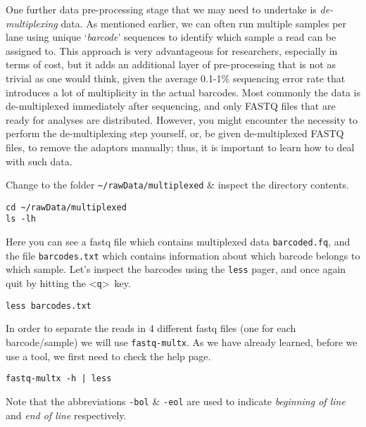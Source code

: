 \begin{note}
One further data pre-processing stage that we may need to undertake is \textit{de-multiplexing} data.
As mentioned earlier, we can often run multiple samples per lane using unique `\textit{barcode}' sequences to identify which sample a read can be assigned to.
This approach is very advantageous for researchers, especially in terms of cost, but it adds an additional layer of pre-processing that is not as trivial as one would think, given the average 0.1-1\% sequencing error rate that introduces a lot of multiplicity in the actual barcodes. 
Most commonly the data is de-multiplexed immediately after sequencing, and only FASTQ files that are ready for analyses are distributed. 
However, you might encounter the necessity to perform the de-multiplexing step yourself, or, be given de-multiplexed FASTQ files, to remove the adaptors manually; thus, it is important to learn how to deal with such data. \\
\end{note}

\begin{steps}
Change to the folder \texttt{\~{}/rawData/multiplexed} \& inspect the directory contents.
\begin{lstlisting}
cd ~/rawData/multiplexed
ls -lh
\end{lstlisting}
Here you can see a fastq file which contains multiplexed data \texttt{barcoded.fq}, and the file \texttt{barcodes.txt} which contains information about which barcode belongs to which sample.
Let's inspect the barcodes using the \texttt{less} pager, and once again quit by hitting the \textless \texttt{q}\textgreater ~key.
\begin{lstlisting}
less barcodes.txt
\end{lstlisting}
\end{steps}

\begin{steps}
In order to separate the reads in 4 different fastq files (one for each barcode/sample) we will use \texttt{fastq-multx}. 
As we have already learned, before we use a tool, we first need to check the help page.
\begin{lstlisting}
fastq-multx -h | less
\end{lstlisting}
Note that the abbreviations \texttt{-bol} \& \texttt{-eol} are used to indicate \textit{beginning of line} and \textit{end of line} respectively.
\end{steps}

